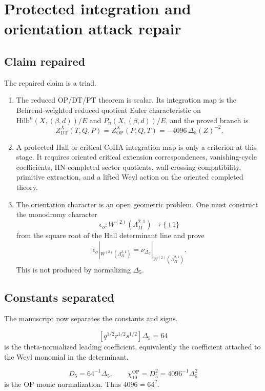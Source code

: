 \section{Protected integration and orientation attack repair}
\label{sec:integration-orientation-attack-repair}

\subsection{Claim repaired}

The repaired claim is a triad.

\begin{enumerate}
\item The reduced OP/DT/PT theorem is scalar.  Its integration map is the
Behrend-weighted reduced quotient Euler characteristic on
\(\mathrm{Hilb}^n(X,(\beta,d))/E\) and \(P_n(X,(\beta,d))/E\), and the
proved branch is
\[
  Z^X_{\mathrm{DT}}(T,Q,P)=Z^X_{\mathrm{OP}}(P,Q,T)
  =-4096\,\Delta_5(Z)^{-2}.
\]
\item A protected Hall or critical CoHA integration map is only a
criterion at this stage.  It requires oriented critical extension
correspondences, vanishing-cycle coefficients, HN-completed sector
quotients, wall-crossing compatibility, primitive extraction, and a
lifted Weyl action on the oriented completed theory.
\item The orientation character is an open geometric problem.  One must
construct the monodromy character
\[
  \epsilon_o:W^{(2)}(\Lambda^{2,1}_{II})\to\{\pm1\}
\]
from the square root of the Hall determinant line and prove
\[
  \epsilon_o|_{W^{(2)}(\Lambda^{2,1}_{II})}
  =
  \nu_{\Delta_5}|_{W^{(2)}(\Lambda^{2,1}_{II})}.
\]
This is not produced by normalizing \(\Delta_5\).
\end{enumerate}

\subsection{Constants separated}

The manuscript now separates the constants and signs.

\[
  [q^{1/2}r^{1/2}s^{1/2}]\Delta_5=64
\]
is the theta-normalized leading coefficient, equivalently the coefficient
attached to the Weyl monomial in the determinant.

\[
  D_5=64^{-1}\Delta_5,\qquad
  \chi_{10}^{\mathrm{OP}}=D_5^2=4096^{-1}\Delta_5^2
\]
is the OP monic normalization.  Thus \(4096=64^2\).

